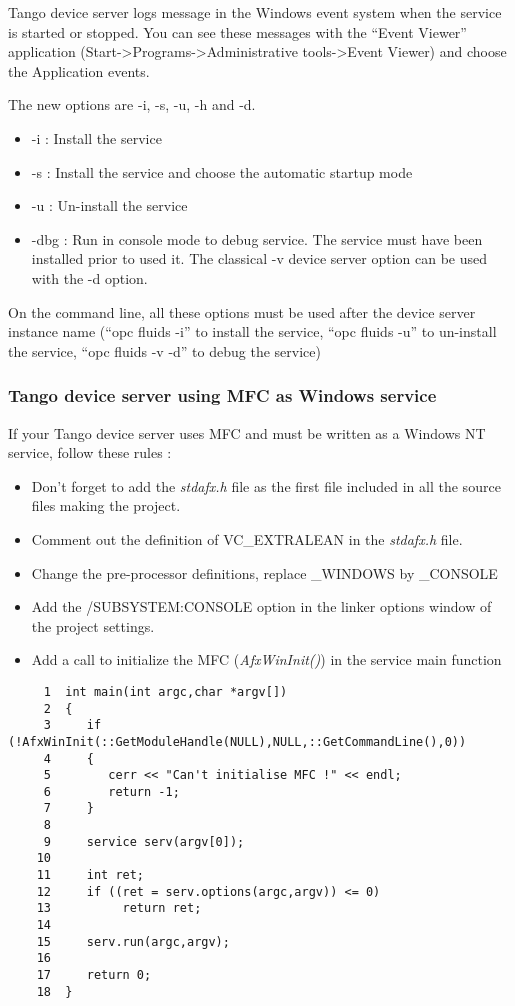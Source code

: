 Tango device server logs message in the Windows event
system when the service is started or stopped. You can see these messages
with the ``Event Viewer'' application (Start->Programs->Administrative
tools->Event Viewer) and choose the Application events.

The new options are -i, -s, -u, -h and -d.
\begin{itemize}
\item -i : Install the service
\item -s : Install the service and choose the automatic startup mode
\item -u : Un-install the service
\item -dbg : Run in console mode to debug service. The service must have
been installed prior to used it. The classical -v device server option
can be used with the -d option.
\end{itemize}
On the command line, all these options must be used after the device
server instance name (``opc fluids -i'' to install the service,
``opc fluids -u'' to un-install the service, ``opc fluids -v -d''
to debug the service)


\subsubsection{Tango device server using MFC as Windows service}

If your Tango device server uses MFC and must be written
as a Windows NT service, follow these rules :
\begin{itemize}
\item Don't forget to add the \emph{stdafx.h} file as the first file included
in all the source files making the project.
\item Comment out the definition of VC\_EXTRALEAN in the \emph{stdafx.h}
file.
\item Change the pre-processor definitions, replace \_WINDOWS by \_CONSOLE
\item Add the /SUBSYSTEM:CONSOLE option in the linker options window of
the project settings.
\item Add a call to initialize the MFC (\emph{AfxWinInit()}) in the service
main function
\end{itemize}

\begin{verbatim}
     1  int main(int argc,char *argv[])
     2  {
     3     if (!AfxWinInit(::GetModuleHandle(NULL),NULL,::GetCommandLine(),0))
     4     {
     5        cerr << "Can't initialise MFC !" << endl;
     6        return -1;
     7     }
     8  
     9     service serv(argv[0]);
    10  
    11     int ret;
    12     if ((ret = serv.options(argc,argv)) <= 0)
    13          return ret;
    14  
    15     serv.run(argc,argv);
    16  
    17     return 0;
    18  }
\end{verbatim}


